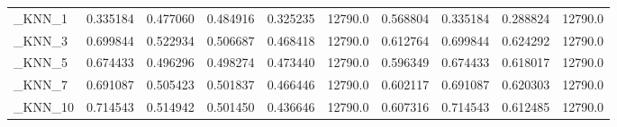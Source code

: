 \begin{tabular}{lrrrrrrrrr}
\_KNN\_1                                             &  0.335184 &         0.477060 &      0.484916 &        0.325235 &        12790.0 &            0.568804 &         0.335184 &           0.288824 &           12790.0 \\
\_KNN\_3                                             &  0.699844 &         0.522934 &      0.506687 &        0.468418 &        12790.0 &            0.612764 &         0.699844 &           0.624292 &           12790.0 \\
\_KNN\_5                                             &  0.674433 &         0.496296 &      0.498274 &        0.473440 &        12790.0 &            0.596349 &         0.674433 &           0.618017 &           12790.0 \\
\_KNN\_7                                             &  0.691087 &         0.505423 &      0.501837 &        0.466446 &        12790.0 &            0.602117 &         0.691087 &           0.620303 &           12790.0 \\
\_KNN\_10                                            &  0.714543 &         0.514942 &      0.501450 &        0.436646 &        12790.0 &            0.607316 &         0.714543 &           0.612485 &           12790.0 \\
\bottomrule
\end{tabular}
